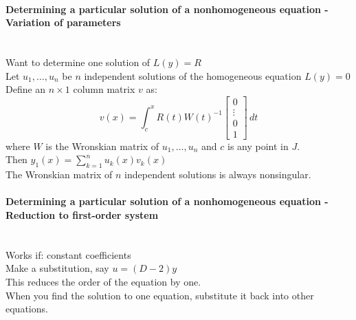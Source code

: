 \documentclass[10pt]{article}
\begin{document}
\paragraph{Determining a particular solution of a nonhomogeneous equation - Variation of parameters}\ \\
Want to determine one solution of $L(y) = R$\\
Let $u_1, \dotsc, u_n$ be $n$ independent solutions of the homogeneous equation $L(y) = 0$\\
Define an $n \times 1$ column matrix $v$ as:
\begin{equation*}
v(x) = \int_c^x R(t) W(t)^{-1}
\begin{bmatrix}
0 \\ \vdots \\ 0 \\ 1
\end{bmatrix}
\, dt
\end{equation*}
where $W$ is the Wronskian matrix of $u_1, \dotsc, u_n$ and $c$ is any point in $J$.\\
Then $y_1(x) = \sum_{k=1}^n u_k(x) v_k(x)$\\
The Wronskian matrix of $n$ independent solutions is always nonsingular.

\paragraph{Determining a particular solution of a nonhomogeneous equation - Reduction to first-order system}\ \\
Works if: constant coefficients\\
Make a substitution, say $u = (D - 2)y$\\
This reduces the order of the equation by one.\\
When you find the solution to one equation, substitute it back into other equations.
\end{document}
